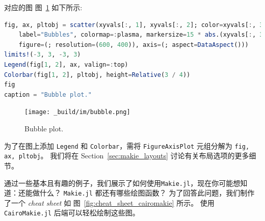 \documentclass[
  notoc %
]{tufte-book}
\newcommand{\passthrough}[1]{#1}
\begin{document}
对应的图 图~\ref{fig:bubble} 如下所示:

\begin{lstlisting}[language=Julia]
fig, ax, pltobj = scatter(xyvals[:, 1], xyvals[:, 2]; color=xyvals[:, 3],
    label="Bubbles", colormap=:plasma, markersize=15 * abs.(xyvals[:, 3]),
    figure=(; resolution=(600, 400)), axis=(; aspect=DataAspect()))
limits!(-3, 3, -3, 3)
Legend(fig[1, 2], ax, valign=:top)
Colorbar(fig[1, 2], pltobj, height=Relative(3 / 4))
fig
caption = "Bubble plot."
\end{lstlisting}

\begin{figure}
\hypertarget{fig:bubble}{%
\centering
\texttt{[image: \_build/im/bubble.png]}
\caption{Bubble plot.}\label{fig:bubble}
}
\end{figure}

为了在图上添加 \passthrough{\lstinline!Legend!} 和
\passthrough{\lstinline!Colorbar!}，需将
\passthrough{\lstinline!FigureAxisPlot!} 元组分解为
\passthrough{\lstinline!fig, ax, pltobj!}。 我们将在
Section~\ref{sec:makie_layouts} 讨论有关布局选项的更多细节。

通过一些基本且有趣的例子，我们展示了如何使用\passthrough{\lstinline!Makie.jl!}，现在你可能想知道：还能做什么？
\passthrough{\lstinline!Makie.jl!} 都还有哪些绘图函数？
为了回答此问题，我们制作了一个 \emph{cheat sheet} 如
图~\ref{fig:cheat_sheet_cairomakie} 所示。 使用
\passthrough{\lstinline!CairoMakie.jl!} 后端可以轻松绘制这些图。
\end{document}
